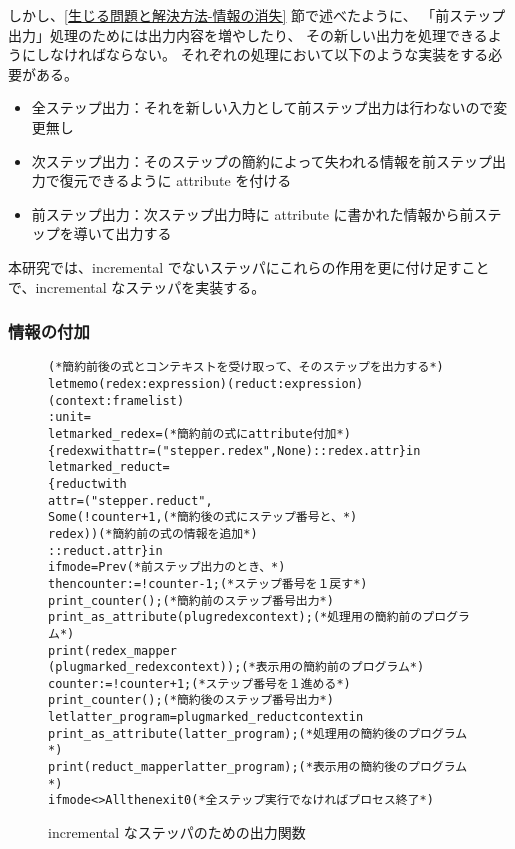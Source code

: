 しかし、\ref{生じる問題と解決方法-情報の消失} 節で述べたように、
「前ステップ出力」処理のためには出力内容を増やしたり、
その新しい出力を処理できるようにしなければならない。
それぞれの処理において以下のような実装をする必要がある。
\begin{itemize}
\item 全ステップ出力：それを新しい入力として前ステップ出力は行わないので変更無し
\item 次ステップ出力：そのステップの簡約によって失われる情報を前ステップ出力で復元できるように attribute を付ける
\item 前ステップ出力：次ステップ出力時に attribute に書かれた情報から前ステップを導いて出力する
\end{itemize}

本研究では、incremental でないステッパにこれらの作用を更に付け足すことで、incremental なステッパを実装する。

\subsubsection{情報の付加}

\begin{figure}[t]
\begin{spacing}{0.8}
  \begin{alltt}
(* 簡約前後の式とコンテキストを受け取って、そのステップを出力する *)
let memo (redex : expression) (reduct : expression) (context : frame list)
  : unit =
  let marked\_redex =                            (* 簡約前の式に attribute 付加 *)
    \{redex with attr = ("stepper.redex", None) :: redex.attr\} in
  let marked\_reduct =
    \{reduct with
     attr = ("stepper.reduct",
             Some (!counter + 1,                 (* 簡約後の式にステップ番号と、 *)
                   redex))                           (* 簡約前の式の情報を追加 *)
            :: reduct.attr\} in
  if mode = Prev                                      (* 前ステップ出力のとき、 *)
  then counter := !counter - 1;                        (* ステップ番号を１戻す *)
  print\_counter ();                                 (* 簡約前のステップ番号出力 *)
  print\_as\_attribute (plug redex context);        (* 処理用の簡約前のプログラム *)
  print (redex\_mapper
           (plug marked\_redex context));          (* 表示用の簡約前のプログラム *)
  counter := !counter + 1;                            (* ステップ番号を１進める *)
  print\_counter ();                                 (* 簡約後のステップ番号出力 *)
  let latter\_program = plug marked\_reduct context in
  print\_as\_attribute (latter\_program);             (* 処理用の簡約後のプログラム *)
  print (reduct\_mapper latter\_program);           (* 表示用の簡約後のプログラム *)
  if mode <> All then exit 0             (* 全ステップ実行でなければプロセス終了 *)
  \end{alltt}
  \end{spacing}
  \caption{incremental なステッパのための出力関数}
  \label{figure:new-memo}
\end{figure}

